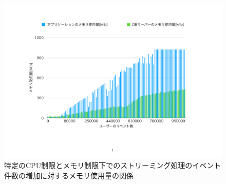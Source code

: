 \documentclass[../../../../../../main]{subfiles}
\begin{document}
    \begin{figure}[H]
        \centering
        \includegraphics[width=12cm]{graph}
        \caption{特定のCPU制限とメモリ制限下でのストリーミング処理のイベント件数の増加に対するメモリ使用量の関係}
        \label{fig:stream-memory-app_1_1024-db_1_1024}
    \end{figure}
\end{document}
